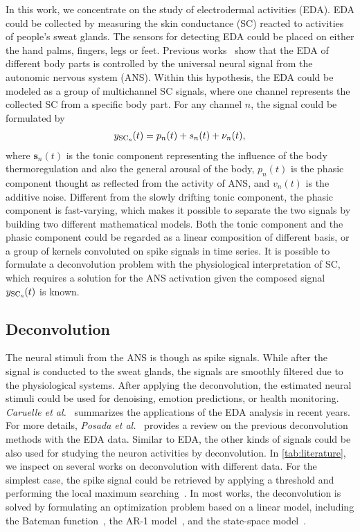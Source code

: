 \documentclass[10pt,conference]{ieeeconf}
\providecommand{\rm}{\mathrm}
\begin{document}
In this work, we concentrate on the study of electrodermal activities (EDA). EDA could be collected by measuring the skin conductance (SC) reacted to activities of people's sweat glands. The sensors for detecting EDA could be placed on either the hand palms, fingers, legs or feet. Previous works~\cite{fowles1981publication,amin2019robust} show that the EDA of different body parts is controlled by the universal neural signal from the autonomic nervous system (ANS). Within this hypothesis, the EDA could be modeled as a group of multichannel SC signals, where one channel represents the collected SC from a specific body part. For any channel $n$, the signal could be formulated by
\begin{align}
  y_{\rm{SC}_\emph{n}}(t) = p_n(t) + s_n(t) + \nu_n(t),
\end{align}
where $\mathbf{s}_n(t)$ is the tonic component representing the influence of the body thermoregulation and also the general arousal of the body, $p_n(t)$ is the phasic component thought as reflected from the activity of ANS, and $v_n(t)$ is the additive noise. Different from the slowly drifting tonic component, the phasic component is fast-varying, which makes it possible to separate the two signals by building two different mathematical models. Both the tonic component and the phasic component could be regarded as a linear composition of different basis, or a group of kernels convoluted on spike signals in time series. It is possible to formulate a deconvolution problem with the physiological interpretation of SC, which requires a solution for the ANS activation given the composed signal  $y_{\rm{SC}_\emph{n}}(t)$  is known.

\subsection{Deconvolution}

The neural stimuli from the ANS is though as spike signals. While after the signal is conducted to the sweat glands, the signals are smoothly filtered due to the physiological systems. After applying the deconvolution, the estimated neural stimuli could be used for denoising, emotion predictions, or health monitoring. \textit{Caruelle et al.}~\cite{caruelle2019use} summarizes the applications of the EDA analysis in recent years. For more details, \textit{Posada et al.}~\cite{posada2020innovations} provides a review on the previous deconvolution methods with the EDA data. Similar to EDA, the other kinds of signals could be also used for studying the neuron activities by deconvolution. In \cref{tab:literature}, we inspect on several works on deconvolution with different data. For the simplest case, the spike signal could be retrieved by applying a threshold and performing the local maximum searching~\cite{kaur2016remote,subramanian2019systematic}. In most works, the deconvolution is solved by formulating an optimization problem based on a linear model, including the Bateman function~\cite{savazzi2019estimation,greco2014electrodermal,greco2015cvxeda,amin2019tonic,hernando2017feature,wickramasuriya2019skin}, the AR-1 model~\cite{friedrich2017fast}, and the state-space model~\cite{kazemipour2017fast,amin2019robust}. 
\end{document}
